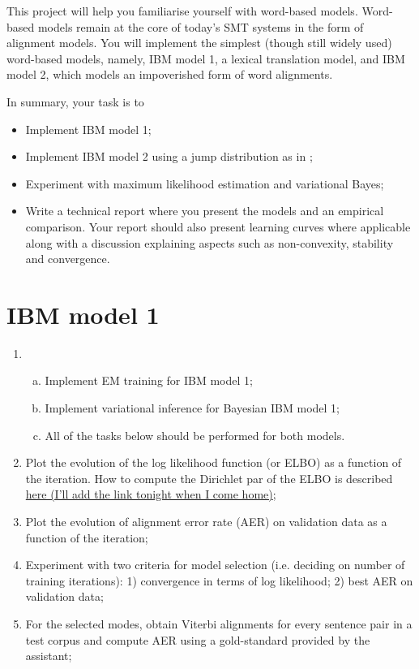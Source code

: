 
This project will help you familiarise yourself with word-based
models.  Word-based models remain at the core of today's SMT systems
in the form of alignment models.
You will implement the simplest (though still widely used) word-based
models, namely, IBM model 1, a lexical translation model, and IBM model 2, which models an impoverished form of word alignments.

In summary, your task is to

\begin{itemize}
	\item Implement IBM model 1;
	\item Implement IBM model 2 using a jump distribution as in \cite{Vogel+1996:HMMWA};
	\item Experiment with maximum likelihood estimation and variational Bayes;
	\item Write a technical report where you present the models and an empirical comparison. Your report should also present learning curves
    where applicable along with a discussion explaining aspects such
    as non-convexity, stability and convergence.
\end{itemize}

\section{IBM model 1}

\begin{enumerate}
	\item 
	\begin{enumerate}[a)]
		\item Implement EM training \citep{Brown+1993:smt} for IBM model 1;
		\item Implement variational inference for Bayesian IBM model 1;
		\item All of the tasks below should be performed for both models.
	\end{enumerate}
	\item Plot the evolution of the log likelihood function (or ELBO) as a function of the iteration. How to compute the Dirichlet par of the ELBO
	is described \href{}{here (I'll add the link tonight when I come home)};
	\item Plot the evolution of alignment error rate (AER) on validation data as a function of the iteration;
	\item Experiment with two criteria for model selection (i.e. deciding on number of training iterations): 1) convergence in terms of log likelihood; 2) best AER on validation data;
	\item For the selected modes, obtain Viterbi alignments for every sentence pair in a test corpus and compute AER using a gold-standard provided by the assistant;
\end{enumerate}

